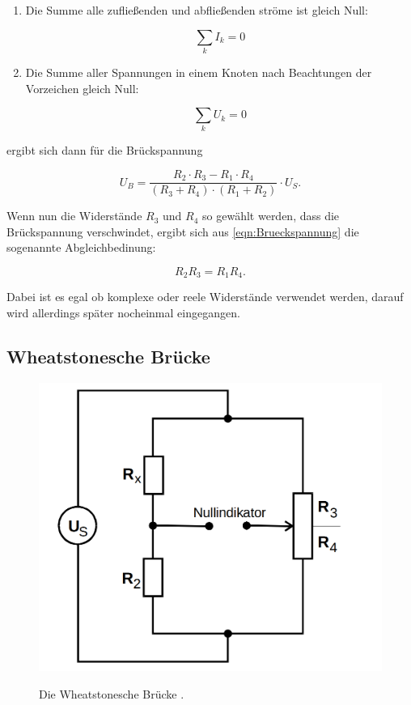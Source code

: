 \begin{enumerate}
    \item Die Summe alle zufließenden und abfließenden ströme ist gleich Null:
    
    \begin{equation}
        \sum_k I_k = 0
    \end{equation}
    \item Die Summe aller Spannungen in einem Knoten nach Beachtungen der Vorzeichen gleich Null:
    
    \begin{equation}
        \sum_k U_k = 0
    \end{equation}
\end{enumerate}

ergibt sich dann für die Brückspannung 

\begin{equation}
    U_B = \frac{R_2\cdot R_3 - R_1 \cdot R_4}{(R_3 + R_4) \cdot (R_1 + R_2)} \cdot U_S .
    \label{eqn:Brueckspannung}
\end{equation}

Wenn nun die Widerstände $R_3$ und $R_4$ so gewählt werden, dass die Brückspannung verschwindet,
ergibt sich aus \eqref{eqn:Brueckspannung} die sogenannte Abgleichbedinung:

\begin{equation}
    R_2 R_3 = R_1 R_4 .
    \label{eqn:abgleich}
\end{equation}

Dabei ist es egal ob komplexe oder reele Widerstände verwendet werden, darauf wird allerdings später nocheinmal eingegangen.

\subsection{Wheatstonesche Brücke}

\begin{figure}
    \centering
    \includegraphics[scale=0.25]{content/Wheatstonesche.png}
    \label{fig:wheatstonesche}
    \caption{Die Wheatstonesche Brücke \cite[S. 219]{anleitung}.}
\end{figure}

